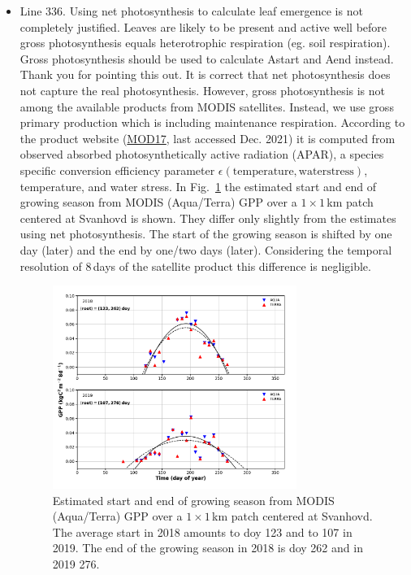 \documentclass{scrartcl}
\begin{document}
\begin{itemize}
\item {\color{blue}Line 336. Using net photosynthesis to calculate leaf emergence is not completely justified. Leaves are likely to be present and active well before gross photosynthesis equals heterotrophic respiration (eg. soil respiration). Gross photosynthesis should be used to calculate Astart and Aend instead.}
Thank you for pointing this out. It is correct that net photosynthesis does not capture the real photosynthesis. However, gross photosynthesis is not among the available products from MODIS satellites. Instead, we use gross primary production which is including maintenance respiration. According to the product website (\href{http://www.ntsg.umt.edu/project/modis/mod17.php}{MOD17}, last accessed Dec. 2021) it is computed from observed absorbed photosynthetically active radiation (APAR), a species specific conversion efficiency parameter $\epsilon(\mathrm{temperature, water stress})$, temperature, and water stress. In Fig.~\ref{fig:modis_gpp} the estimated start and end of growing season from MODIS (Aqua/Terra) GPP over a $1\times 1$\,km patch centered at Svanhovd is shown. They differ only slightly from the estimates using net photosynthesis. The start of the growing season is shifted by one day (later) and the end by one/two days (later). Considering the temporal resolution of 8\,days of the satellite product this difference is negligible. 

\begin{figure}[!th]
    \centering
    \includegraphics[width=0.75\textwidth]{./modis_Gpp.png}
    \caption{Estimated start and end of growing season from MODIS (Aqua/Terra) GPP over a $1\times 1$\,km patch centered at Svanhovd. The average start in 2018 amounts to doy 123 and to 107 in 2019. The end of the growing season in 2018 is doy 262 and in 2019 276.}
    \label{fig:modis_gpp}
\end{figure}


\end{itemize}
\end{document}
